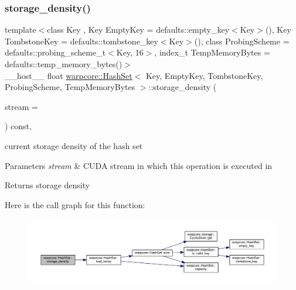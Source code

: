 \subsubsection{\texorpdfstring{storage\+\_\+density()}{storage\_density()}}
{\footnotesize\ttfamily template$<$class Key , Key Empty\+Key = defaults\+::empty\+\_\+key$<$\+Key$>$(), Key Tombstone\+Key = defaults\+::tombstone\+\_\+key$<$\+Key$>$(), class Probing\+Scheme  = defaults\+::probing\+\_\+scheme\+\_\+t$<$\+Key, 16$>$, index\+\_\+t Temp\+Memory\+Bytes = defaults\+::temp\+\_\+memory\+\_\+bytes()$>$ \\
\+\_\+\+\_\+host\+\_\+\+\_\+ float \hyperlink{classwarpcore_1_1HashSet}{warpcore\+::\+Hash\+Set}$<$ Key, Empty\+Key, Tombstone\+Key, Probing\+Scheme, Temp\+Memory\+Bytes $>$\+::storage\+\_\+density (\begin{DoxyParamCaption}\item[{cuda\+Stream\+\_\+t}]{stream = {} }\end{DoxyParamCaption}) const\hspace{0.3cm}{\ttfamily [inline]}, {\ttfamily [noexcept]}}



current storage density of the hash set 


\begin{DoxyParams}{Parameters}
{\em stream} & C\+U\+DA stream in which this operation is executed in \\
\hline
\end{DoxyParams}
\begin{DoxyReturn}{Returns}
storage density 
\end{DoxyReturn}
Here is the call graph for this function\+:
\nopagebreak
\begin{figure}[H]
\begin{center}
\leavevmode
\includegraphics[width=350pt]{classwarpcore_1_1HashSet_a178dec74a9404d6b89f37febec381dca_cgraph}
\end{center}
\end{figure}
\mbox{\label{classwarpcore_1_1HashSet_af11b7b19315de5409098eaeb31702c63}} 
